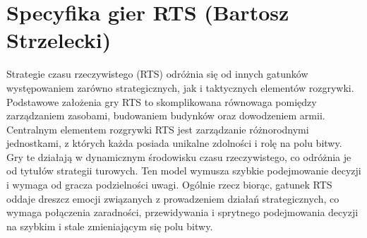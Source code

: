\section{Specyfika gier RTS (Bartosz Strzelecki)}

Strategie czasu rzeczywistego (RTS) odróżnia się od innych gatunków występowaniem zarówno strategicznych, jak i taktycznych
elementów rozgrywki. Podstawowe założenia gry RTS to skomplikowana równowaga pomiędzy zarządzaniem zasobami, budowaniem budynków oraz
dowodzeniem armii. Centralnym elementem rozgrywki RTS jest zarządzanie różnorodnymi jednostkami, z których każda posiada unikalne zdolności i rolę na polu bitwy.
Gry te działają w dynamicznym środowisku czasu rzeczywistego, co odróżnia je od tytułów strategii turowych. Ten model wymusza szybkie podejmowanie decyzji
i wymaga od gracza podzielności uwagi. Ogólnie rzecz biorąc, gatunek RTS oddaje dreszcz emocji związanych z prowadzeniem działań strategicznych, co wymaga połączenia zaradności,
przewidywania i sprytnego podejmowania decyzji na szybkim i stale zmieniającym się polu bitwy.
